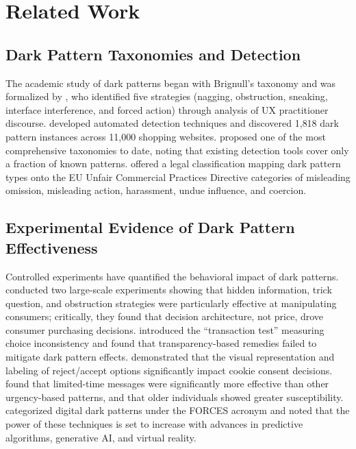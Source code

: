 \documentclass[a4paper,fleqn]{cas-sc}
\begin{document}
\section{Related Work}
\subsection{Dark Pattern Taxonomies and Detection}
The academic study of dark patterns began with Brignull's taxonomy \citep{brignull2010} and was formalized by \citet{gray2018}, who identified five strategies (nagging, obstruction, sneaking, interface interference, and forced action) through analysis of UX practitioner discourse. \citet{mathur2019} developed automated detection techniques and discovered 1{,}818 dark pattern instances across 11{,}000 shopping websites. \citet{li2024} proposed one of the most comprehensive taxonomies to date, noting that existing detection tools cover only a fraction of known patterns. \citet{isola2025} offered a legal classification mapping dark pattern types onto the EU Unfair Commercial Practices Directive categories of misleading omission, misleading action, harassment, undue influence, and coercion.

\subsection{Experimental Evidence of Dark Pattern Effectiveness}
Controlled experiments have quantified the behavioral impact of dark patterns. \citet{luguri2021} conducted two large-scale experiments showing that hidden information, trick question, and obstruction strategies were particularly effective at manipulating consumers; critically, they found that decision architecture, not price, drove consumer purchasing decisions. \citet{bogliacino2026} introduced the ``transaction test'' measuring choice inconsistency and found that transparency-based remedies failed to mitigate dark pattern effects. \citet{berens2024} demonstrated that the visual representation and labeling of reject/accept options significantly impact cookie consent decisions. \citet{koh2023} found that limited-time messages were significantly more effective than other urgency-based patterns, and that older individuals showed greater susceptibility. \citet{fagan2024} categorized digital dark patterns under the FORCES acronym and noted that the power of these techniques is set to increase with advances in predictive algorithms, generative AI, and virtual reality.
\end{document}
